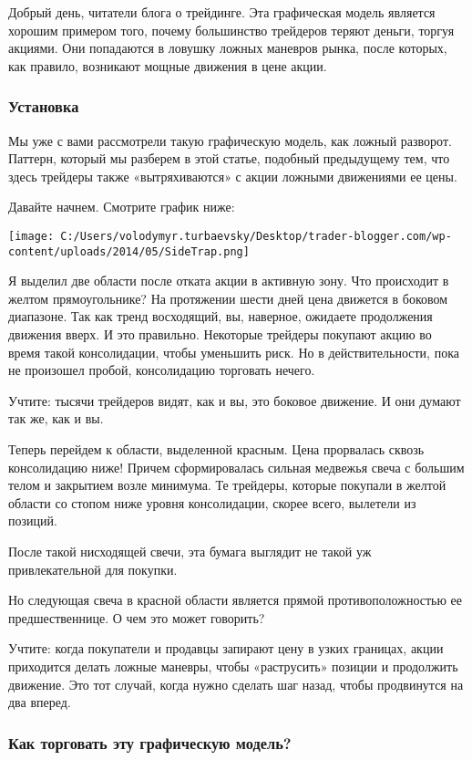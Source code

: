 \documentclass[a5paper]{article}
\begin{document}
Добрый день, читатели блога о трейдинге. Эта графическая модель
является хорошим примером того, почему большинство трейдеров теряют
деньги, торгуя акциями. Они попадаются в ловушку ложных маневров
рынка, после которых, как правило, возникают мощные движения в цене
акции.

\subsubsection{Установка}

Мы уже с вами рассмотрели такую графическую модель, как ложный разворот. Паттерн, который мы разберем в этой статье, подобный предыдущему тем, что здесь трейдеры также «вытряхиваются» с акции ложными движениями ее цены.

Давайте начнем. Смотрите график ниже:

\texttt{[image: C:/Users/volodymyr.turbaevsky/Desktop/trader-blogger.com/wp-content/uploads/2014/05/SideTrap.png]}

Я выделил две области после отката акции в активную зону. Что происходит в желтом прямоугольнике? На протяжении шести дней цена движется в боковом диапазоне. Так как тренд восходящий, вы, наверное, ожидаете продолжения движения вверх. И это правильно. Некоторые трейдеры покупают акцию во время такой консолидации, чтобы уменьшить риск. Но в действительности, пока не произошел пробой, консолидацию торговать нечего.

Учтите: тысячи трейдеров видят, как и вы, это боковое движение. И они думают так же, как и вы.

Теперь перейдем к области, выделенной красным. Цена прорвалась сквозь консолидацию ниже! Причем сформировалась сильная медвежья свеча с большим телом и закрытием возле минимума. Те трейдеры, которые покупали в желтой области со стопом ниже уровня консолидации, скорее всего, вылетели из позиций.

После такой нисходящей свечи, эта бумага выглядит не такой уж привлекательной для покупки.

Но следующая свеча в красной области является прямой противоположностью ее предшественнице. О чем это может говорить?

Учтите: когда покупатели и продавцы запирают цену в узких границах,
акции приходится делать ложные маневры, чтобы «раструсить» позиции и
продолжить движение. Это тот случай, когда нужно сделать шаг назад,
чтобы продвинутся на два вперед.


\subsubsection{Как торговать эту графическую модель?}
\end{document}
